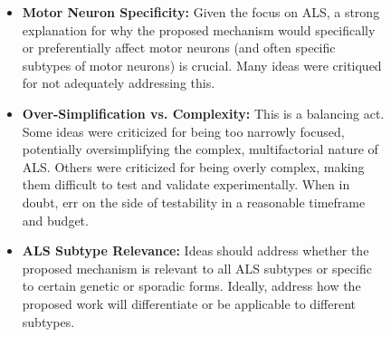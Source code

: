 \begin{figure}[htbp!]
\begin{tcolorbox}
\begin{itemize}
\begin{itemize}
    \end{itemize}
    \item \textbf{Motor Neuron Specificity:} Given the focus on ALS, a strong explanation for why the proposed mechanism would specifically or preferentially affect motor neurons (and often specific subtypes of motor neurons) is crucial. Many ideas were critiqued for not adequately addressing this.
    \item \textbf{Over-Simplification vs. Complexity:} This is a balancing act. Some ideas were criticized for being too narrowly focused, potentially oversimplifying the complex, multifactorial nature of ALS. Others were criticized for being overly complex, making them difficult to test and validate experimentally. When in doubt, err on the side of testability in a reasonable timeframe and budget.
    \item \textbf{ALS Subtype Relevance:} Ideas should address whether the proposed mechanism is relevant to all ALS subtypes or specific to certain genetic or sporadic forms. Ideally, address how the proposed work will differentiate or be applicable to different subtypes.
\end{itemize}


\end{tcolorbox}
\end{figure}
